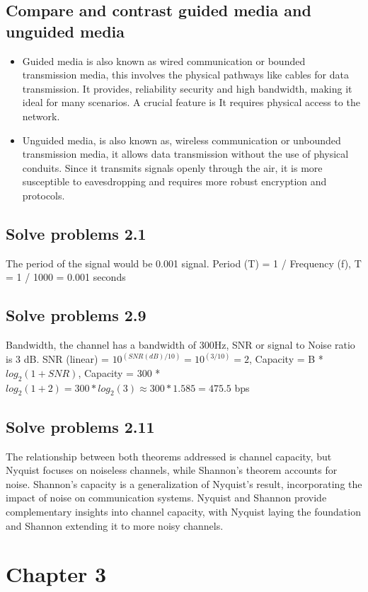 \documentclass{article}
\begin{document}
\subsection{Compare and contrast guided media and unguided media}
\begin{itemize}
\item Guided media is also known as wired communication or bounded transmission media, this involves the physical pathways like cables for data transmission. It provides, reliability security and high bandwidth, making it ideal for many scenarios. A crucial feature is It requires physical access to the network.
\item Unguided media, is also known as, wireless communication or unbounded transmission media, it allows data transmission without the use of physical conduits. Since it transmits signals openly through the air, it is more susceptible to eavesdropping and requires more robust encryption and protocols.
\end{itemize}

\subsection{Solve problems 2.1}
The period of the signal would be 0.001 signal. Period (T) = 1 / Frequency (f), T = 1 / 1000 = 0.001 seconds

\subsection{Solve problems 2.9}
Bandwidth, the channel has a bandwidth of 300Hz, SNR or signal to Noise ratio is 3 dB. SNR (linear) = $10^{(SNR (dB) / 10)} = 10^{(3 / 10)} = 2$, Capacity = B * $log_2(1 + SNR)$, Capacity = 300 * $log_2(1 + 2) = 300 * log_2(3) \approx 300 * 1.585 = 475.5$ bps

\subsection{Solve problems 2.11}
The relationship between both theorems addressed is channel capacity, but Nyquist focuses on noiseless channels, while Shannon’s theorem accounts for noise. Shannon’s capacity is a generalization of Nyquist's result, incorporating the impact of noise on communication systems. Nyquist and Shannon provide complementary insights into channel capacity, with Nyquist laying the foundation and Shannon extending it to more noisy channels.

\section{Chapter 3}
\end{document}
